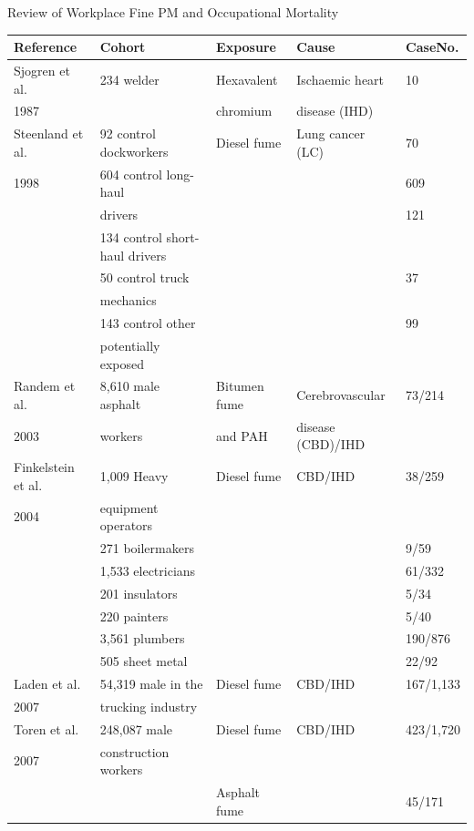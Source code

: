 \documentclass[final,t]{beamer}
\begin{document}
\begin{frame}[fragile]
\begin{columns}[t]
\begin{column}{0.26\linewidth}
\begin{block}{Review of Workplace Fine PM and Occupational Mortality}
\\
\begin{tabular}{lllll}
  \hline
Reference & Cohort & Exposure & Cause & CaseNo. \\ 
  \hline
Sjogren et al. & 234 welder & Hexavalent & Ischaemic heart & 10 \\ 
  1987 &  & chromium & disease (IHD) &  \\ 
  Steenland et al. & 92 control dockworkers & Diesel fume & Lung cancer (LC) & 70 \\ 
  1998 & 604 control long-haul &  &  & 609 \\ 
   & drivers &  &  & 121 \\ 
   & 134 control short-haul drivers &  &  &  \\ 
   & 50  control truck &  &  & 37 \\ 
   & mechanics &  &  &  \\ 
   & 143  control other &  &  & 99 \\ 
   & potentially exposed &  &  &  \\ 
  Randem et al. & 8,610 male asphalt & Bitumen fume & Cerebrovascular & 73/214 \\ 
  2003 & workers & and PAH & disease (CBD)/IHD &  \\ 
  Finkelstein et al. & 1,009 Heavy & Diesel fume & CBD/IHD & 38/259 \\ 
  2004 & equipment operators &  &  &  \\ 
   & 271 boilermakers &  &  & 9/59 \\ 
   & 1,533 electricians &  &  & 61/332 \\ 
   & 201 insulators &  &  & 5/34 \\ 
   & 220 painters &  &  & 5/40 \\ 
   & 3,561 plumbers &  &  & 190/876 \\ 
   & 505 sheet metal &  &  & 22/92 \\ 
  Laden et al. & 54,319  male  in the & Diesel fume & CBD/IHD & 167/1,133 \\ 
  2007 & trucking industry &  &  &  \\ 
  Toren et al. & 248,087 male & Diesel fume & CBD/IHD & 423/1,720 \\ 
  2007 & construction workers &  &  &  \\ 
   &  & Asphalt fume &  & 45/171 \\ 

\end{tabular}
\end{block}
\end{column}
\end{columns}
\end{frame}
\end{document}
